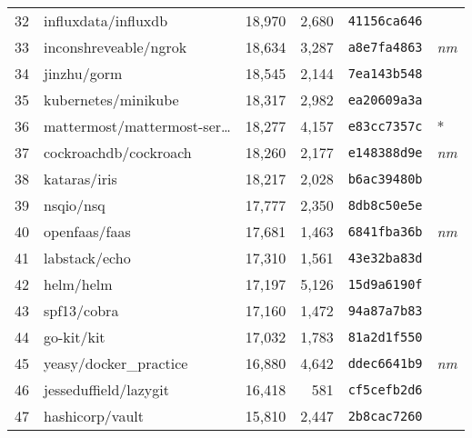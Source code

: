 {\begin{supertabular}{llrrll}
        32  &                influxdata/influxdb & 18,970 &  2,680 &  \texttt{41156ca646} &              \\
        33  &              inconshreveable/ngrok & 18,634 &  3,287 &  \texttt{a8e7fa4863} &  \textit{nm} \\
        34  &                        jinzhu/gorm & 18,545 &  2,144 &  \texttt{7ea143b548} &              \\
        35  &                kubernetes/minikube & 18,317 &  2,982 &  \texttt{ea20609a3a} &              \\
        36  &    mattermost/mattermost-ser\ldots & 18,277 &  4,157 &  \texttt{e83cc7357c} &            * \\
        37  &              cockroachdb/cockroach & 18,260 &  2,177 &  \texttt{e148388d9e} &  \textit{nm} \\
        38  &                       kataras/iris & 18,217 &  2,028 &  \texttt{b6ac39480b} &              \\
        39  &                          nsqio/nsq & 17,777 &  2,350 &  \texttt{8db8c50e5e} &              \\
        40  &                      openfaas/faas & 17,681 &  1,463 &  \texttt{6841fba36b} &  \textit{nm} \\
        41  &                      labstack/echo & 17,310 &  1,561 &  \texttt{43e32ba83d} &              \\
        42  &                          helm/helm & 17,197 &  5,126 &  \texttt{15d9a6190f} &              \\
        43  &                        spf13/cobra & 17,160 &  1,472 &  \texttt{94a87a7b83} &              \\
        44  &                         go-kit/kit & 17,032 &  1,783 &  \texttt{81a2d1f550} &              \\
        45  &             yeasy/docker\_practice & 16,880 &  4,642 &  \texttt{ddec6641b9} &  \textit{nm} \\
        46  &              jesseduffield/lazygit & 16,418 &    581 &  \texttt{cf5cefb2d6} &              \\
        47  &                    hashicorp/vault & 15,810 &  2,447 &  \texttt{2b8cac7260} &              \\

\end{supertabular}}

